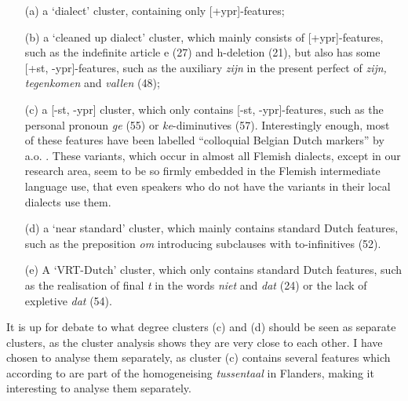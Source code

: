 \documentclass[output=paper]{LSP/langsci}
\begin{document}
\begin{itemize}
\item[(a)] a ‘dialect’ cluster, containing only [+ypr]-features;
\item[(b)] a ‘cleaned up dialect’ cluster, which mainly consists of [+ypr]-features, such as the indefinite article e (27) and h-deletion (21), but also has some [+st, -ypr]-features, such as the auxiliary \textit{zijn} in the present perfect of \textit{zijn, tegenkomen} and \textit{vallen} (48);
\item[(c)] a [-st, -ypr] cluster, which only contains [-st, -ypr]-features, such as the personal pronoun \textit{ge} (55) or \textit{ke}{}-diminutives (57). Interestingly enough, most of these features have been labelled “colloquial Belgian Dutch markers” by a.o. \citet[534-5]{hinskens_supra-regional_2013}. These variants, which occur in almost all Flemish dialects, except in our research area, seem to be so firmly embedded in the Flemish intermediate language use, that even speakers who do not have the variants in their local dialects use them.
\item[(d)] a ‘near standard’ cluster, which mainly contains standard Dutch features, such as the preposition \textit{om} introducing subclauses with to-infinitives (52). 
\item[(e)] A ‘VRT-Dutch’ cluster, which only contains standard Dutch features, such as the realisation of final \textit{t} in the words \textit{niet} and \textit{dat} (24) or the lack of expletive \textit{dat} (54).
\end{itemize}

It is up for debate to what degree clusters (c) and (d) should be seen as separate clusters, as the cluster analysis shows they are very close to each other. I have chosen to analyse them separately, as cluster (c) contains several features which according to \citet{taeldeman_zich_2008} are part of the homogeneising \textit{tussentaal} in Flanders, making it interesting to analyse them separately. 
\end{document}
